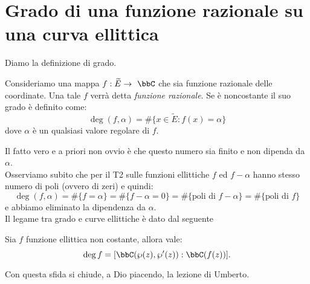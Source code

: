 \section{Grado di una funzione razionale su una curva ellittica}
Diamo la definizione di grado. 
\begin{definizione}
Consideriamo una mappa $f:\widetilde{E}\rar\ \bbC$ che sia funzione razionale delle coordinate. Una tale $f$ verrà detta {\it funzione razionale}. Se è noncostante il suo grado è definito come:
$$
\deg(f,\alpha)=\#\{x\in \widetilde{E}:f(x)=\alpha\}
$$
dove $\alpha$ è un qualsiasi valore regolare di $f$.
\end{definizione}
Il fatto vero e a priori non ovvio è che questo numero sia finito e non dipenda da $\alpha$.\\
Osserviamo subito che per il T2 sulle funzioni ellittiche $f$ ed $f-\alpha$ hanno stesso numero di poli (ovvero di zeri) e quindi:
$$
\deg(f,\alpha)=\#\{f=\alpha\}=\#\{f-\alpha=0\}=\#\{\mbox{poli di } f-\alpha\}=\#\{\mbox{poli di } f\}
$$
e abbiamo eliminato la dipendenza da $\alpha$.\\
Il legame tra grado e curve ellittiche è dato dal seguente
\begin{esercizio}
Sia $f$ funzione ellittica non costante, allora vale:
$$
\deg f= [\bbC(\wp(z),\wp'(z)):\bbC(f(z))].
$$
\end{esercizio}
Con questa sfida si chiude, a Dio piacendo, la lezione di Umberto.

